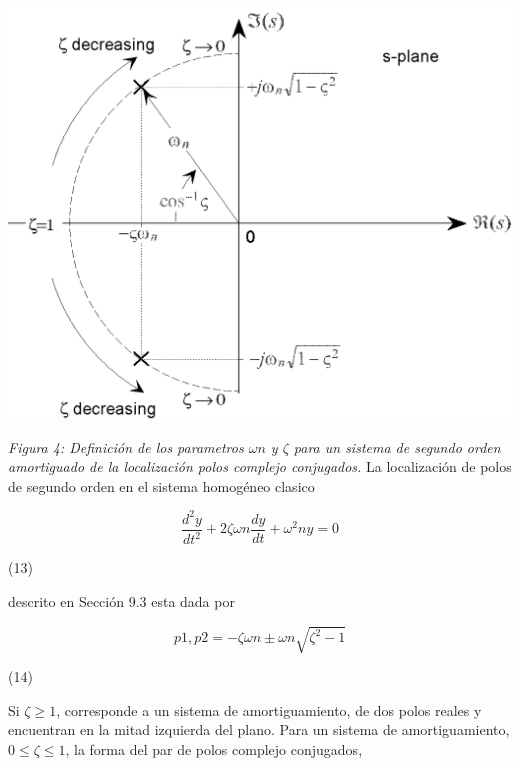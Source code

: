 \documentclass[10pt,a4paper]{article}
\begin{document}
\begin{center}
  \includegraphics[scale=0.2]{img/figura4.png}
\end{center}
\textit{Figura 4: Definición de los parametros $\omega{\scriptscriptstyle n}$ y $\zeta$ para un sistema de segundo orden amortiguado de la localización polos complejo conjugados.}
La localización de polos de segundo orden en el sistema homogéneo clasico
\begin{center}
  \[\frac{d^{2}y}{dt^{2}}+2\zeta\omega{\scriptscriptstyle n}\frac{dy}{dt}+\omega^{2}{\scriptscriptstyle n}y=0\]
  \begin{minipage}{0.9\textwidth}
    \begin{flushright}
        (13)
    \end{flushright}
  \end{minipage}
\end{center}
descrito en Sección 9.3 esta dada por

\begin{center}
  \[p{\scriptscriptstyle 1},p{\scriptscriptstyle 2}=-\zeta\omega{\scriptscriptstyle n}\pm\omega{\scriptscriptstyle n}\sqrt{\zeta^{2}-1}\]
  \begin{minipage}{0.9\textwidth}
    \begin{flushright}
        (14)
    \end{flushright}
  \end{minipage}
\end{center}

Si $\zeta \geq 1$, corresponde a un sistema de amortiguamiento, de dos polos reales y encuentran en la mitad izquierda del plano. Para un sistema de amortiguamiento, $0 \leq \zeta \leq 1$, la forma del par de polos complejo conjugados,
\end{document}
